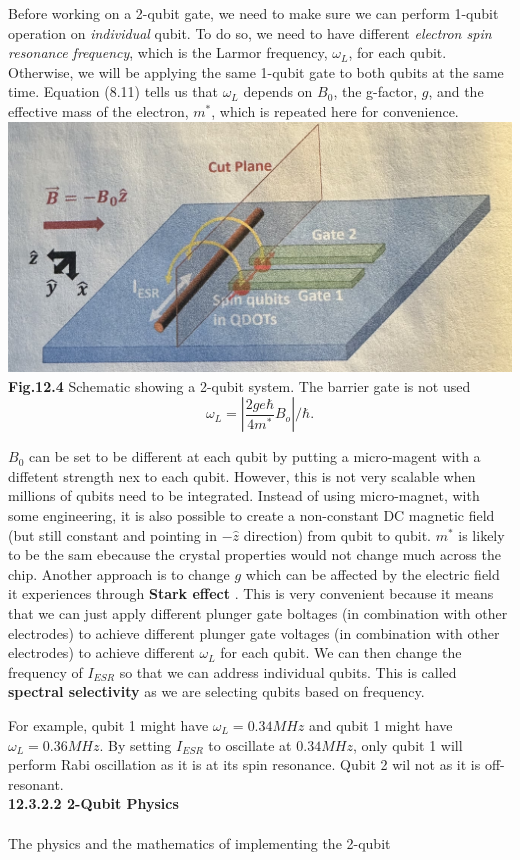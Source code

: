 \documentclass{article}
\begin{document}
Before working on a 2-qubit gate, we need to make sure we can perform 1-qubit operation on \textit{individual} qubit.
To do so, we need to have different \textit{electron spin resonance frequency}, which is the Larmor frequency,
$\omega_L$, for each qubit. Otherwise, we will be applying the same 1-qubit gate to both qubits at the same time.
Equation (8.11) tells us that $\omega_L$ depends on $B_0$, the g-factor, $g$, and the effective mass of the electron, 
$m^*$, which is repeated here for convenience.\\[6pt]

\includegraphics[scale=0.45]{Fig.12.4.jpeg}
\\
\textbf{Fig.12.4} Schematic showing a 2-qubit system. The barrier gate is not used
\\[10pt]
\begin{equation}\label{eq 12.10}
  \omega_L=\left|\frac{2ge\hbar}{4m^*}B_o\right|/\hbar. \tag{12.10}
\end{equation}

$B_0$ can be set to be different at each qubit by putting a micro-magent with a diffetent
strength nex to each qubit. However, this is not very scalable when millions of qubits need to
be integrated. Instead of using micro-magnet, with some engineering, it is also possible to create
a non-constant DC magnetic field (but still constant and pointing in $-\hat{z}$ direction) from
qubit to qubit. $m^*$ is likely to be the sam ebecause the crystal properties would not change
much across the chip. Another approach is to change $g$ which can be affected by the electric field
it experiences through \textbf{Stark effect} \cite{veldhorst2014addressable}. This is very convenient 
because it means that we can just apply different plunger gate boltages (in combination with other electrodes)
to achieve different plunger gate voltages (in combination with other electrodes) to achieve different
$\omega_L$ for each qubit. We can then change the frequency of $I_{ESR}$ so that we can address individual qubits.
This is called \textbf{spectral selectivity} as we are selecting qubits based on frequency.

For example, qubit 1 might have $\omega_L=0.34MHz$ and qubit 1 might have $\omega_L=0.36MHz$.
By setting $I_{ESR}$ to oscillate at $0.34MHz$, only qubit 1 will perform Rabi oscillation as it
is at its spin resonance. Qubit 2 wil not as it is off-resonant.\\[15pt]
\textbf{12.3.2.2 2-Qubit Physics}\\\\
The physics and the mathematics of implementing the 2-qubit 
\end{document}
